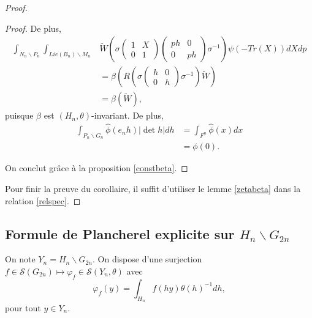 \documentclass{amsart}
\begin{document}
\begin{proof}
\begin{proof}
De plus,
\begin{equation}
\begin{split}
\int_{N_n \backslash P_n} \int_{Lie(B_n) \backslash M_n} &\widetilde{W}\left(\sigma\begin{pmatrix}
1 & X \\
0 & 1
\end{pmatrix} \begin{pmatrix}
ph & 0 \\
0 & ph
\end{pmatrix} \sigma^{-1}\right) \psi(-Tr(X)) dX dp \\
&= \beta\left(R\left(\sigma \begin{pmatrix}
h & 0 \\
0 & h
\end{pmatrix} \sigma^{-1}\right) \widetilde{W}\right) \\
&= \beta(\widetilde{W}),
\end{split}
\end{equation}
puisque $\beta$ est $(H_n, \theta)$-invariant. De plus,
\begin{equation}
\begin{split}
\int_{P_n \backslash G_n}  \widehat{\phi}(e_nh) |\det h| dh &= \int_{F^n} \widehat{\phi}(x) dx \\
&= \phi(0).
\end{split}
\end{equation}

On conclut grâce à la proposition \ref{constbeta}.
\end{proof}

Pour finir la preuve du corollaire, il suffit d'utiliser le lemme \ref{zetabeta} dans la relation \ref{relspec}.
\end{proof}

\subsection{Formule de Plancherel explicite sur $H_n \backslash G_{2n}$}

On note $Y_n = H_n \backslash G_{2n}$. On dispose d'une surjection $f \in \mathcal{S}(G_{2n}) \mapsto \varphi_f \in \mathcal{S}(Y_n, \theta)$ avec
\begin{equation}
\varphi_f(y) = \int_{H_n} f(hy) \theta(h)^{-1} dh,
\end{equation}
pour tout $y \in Y_n$. 
\end{document}
